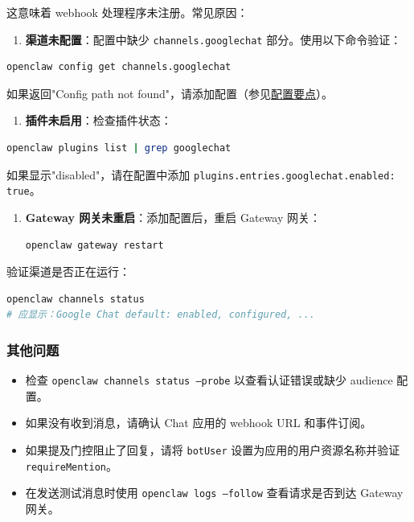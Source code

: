 这意味着 webhook 处理程序未注册。常见原因：

\begin{enumerate}
  \item \textbf{渠道未配置}：配置中缺少 \texttt{channels.googlechat} 部分。使用以下命令验证：
\end{enumerate}


\begin{lstlisting}[language=bash]
   openclaw config get channels.googlechat
\end{lstlisting}


如果返回"Config path not found"，请添加配置（参见\href{\#配置要点}{配置要点}）。

\begin{enumerate}
  \item \textbf{插件未启用}：检查插件状态：
\end{enumerate}


\begin{lstlisting}[language=bash]
   openclaw plugins list | grep googlechat
\end{lstlisting}


如果显示"disabled"，请在配置中添加 \texttt{plugins.entries.googlechat.enabled: true}。

\begin{enumerate}
  \item \textbf{Gateway 网关未重启}：添加配置后，重启 Gateway 网关：
\begin{lstlisting}[language=bash]
   openclaw gateway restart
\end{lstlisting}

\end{enumerate}


验证渠道是否正在运行：

\begin{lstlisting}[language=bash]
openclaw channels status
# 应显示：Google Chat default: enabled, configured, ...
\end{lstlisting}


\subsubsection{其他问题}


\begin{itemize}
  \item 检查 \texttt{openclaw channels status --probe} 以查看认证错误或缺少 audience 配置。
  \item 如果没有收到消息，请确认 Chat 应用的 webhook URL 和事件订阅。
  \item 如果提及门控阻止了回复，请将 \texttt{botUser} 设置为应用的用户资源名称并验证 \texttt{requireMention}。
  \item 在发送测试消息时使用 \texttt{openclaw logs --follow} 查看请求是否到达 Gateway 网关。
\end{itemize}


